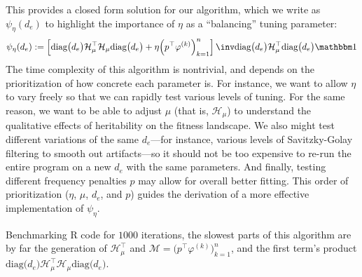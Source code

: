 \documentclass{article}
\begin{document}
This provides a closed form solution for our algorithm, which we write as $\psi_\eta(d_e)$ to highlight the importance of $\eta$ as a ``balancing'' tuning parameter:
$$\psi_\eta(d_e):=\left[\textrm{diag}\big(d_e\big)\mathcal H_\mu^\top\mathcal H_\mu\textrm{diag}\big(d_e\big)+\eta\Big(p^\top\varphi^{(k)}\Big)_{k=1}^n\right]\inv\textrm{diag}\big(d_e\big)\mathcal H_\mu^\top\textrm{diag}\big(d_e\big)\mathbbm1$$
The time complexity of this algorithm is nontrivial, and depends on the prioritization of how concrete each parameter is. For instance, we want to allow $\eta$ to vary freely so that we can rapidly test various levels of tuning. For the same reason, we want to be able to adjust $\mu$ (that is, $\mathcal H_\mu$) to understand the qualitative effects of heritability on the fitness landscape. We also might test different variations of the same $d_e$—for instance, various levels of Savitzky-Golay filtering to smooth out artifacts—so it should not be too expensive to re-run the entire program on a new $d_e$ with the same parameters. And finally, testing different frequency penalties $p$ may allow for overall better fitting. This order of prioritization ($\eta$, $\mu$, $d_e$, and $p$) guides the derivation of a more effective implementation of $\psi_\eta$.

Benchmarking R code for $1000$ iterations, the slowest parts of this algorithm are by far the generation of $\mathcal H_\mu^\top$ and $\mathcal M=\big(p^\top\varphi^{(k)}\big)_{k=1}^n$, and the first term's product $\textrm{diag}\big(d_e\big)\mathcal H_\mu^\top\mathcal H_\mu\textrm{diag}\big(d_e\big)$.
\end{document}
